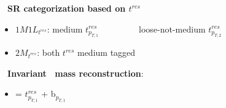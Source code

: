 {  \begin{columns}[T]
    \begin{column}{0.02\textwidth}\end{column}
  \begin{column}{0.53\textwidth}
    \normalsize
    $\ \ $ \textbf{SR categorization based on $t^{res}$}
    \begin{itemize}
      \small
    \item \textcolor{kDarkGreen}{$1M1L_{t^{res}}$}: medium
      $t^{res}_{p_{T,1}}$ \newline
      \textcolor{white}{$1M1L_{t^{res}}$:} loose-not-medium
      $t^{res}_{p_{T,2}}$
        \item \textcolor{kDarkGreen}{$2M_{t^{res}}$}: both $t^{res}$ medium tagged
    \end{itemize}
    
    \vspace{0.3cm}
    
    $\ \ $ \textbf{Invariant \PHpm~mass reconstruction}:
    \begin{itemize}
      \large
    \item[] \textcolor{kOrange}{\mHpmReco = $t^{res}_{p_{T,1}}$
      + b$_{p_{T,1}}$}
    \end{itemize}    
  \end{column}
  
  \begin{column}{0.41\textwidth}
    \vspace{-0.4cm}
  \end{column}
  \begin{column}{0.02\textwidth}\end{column}
\end{columns}
}


